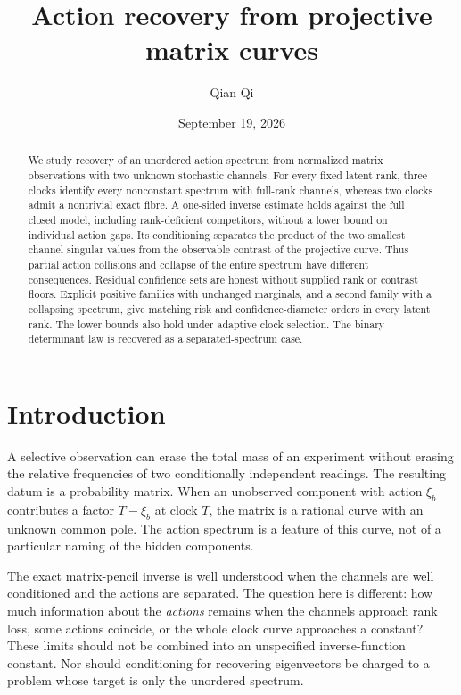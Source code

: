 \documentclass[11pt,reqno]{amsart}
\title[Action recovery from projective matrix curves]{Action recovery from projective matrix curves}
\author{Qian Qi}
\date{September 19, 2026}
\numberwithin{equation}{section}
\theoremstyle{definition}\newtheorem{definition}[theorem]{Definition}
\theoremstyle{remark}\newtheorem{remark}[theorem]{Remark}
\begin{document}
\begin{abstract}
We study recovery of an unordered action spectrum from normalized
matrix observations with two unknown stochastic channels. For every
fixed latent rank, three clocks identify every nonconstant spectrum
with full-rank channels, whereas two clocks admit a nontrivial exact fibre. A one-sided inverse estimate
holds against the full closed model, including rank-deficient
competitors, without a lower bound on individual action gaps. Its
conditioning separates the product of the two smallest channel
singular values from the observable contrast of the projective curve.
Thus partial action collisions and collapse of the entire spectrum
have different consequences. Residual confidence sets are honest
without supplied rank or contrast floors. Explicit positive families
with unchanged marginals, and a second family with a collapsing
spectrum, give matching risk and confidence-diameter orders in every
latent rank. The lower bounds also hold under adaptive clock selection.
The binary determinant law is recovered as a separated-spectrum case.
\end{abstract}
\maketitle

\section{Introduction}
A selective observation can erase the total mass of an experiment
without erasing the relative frequencies of two conditionally
independent readings. The resulting datum is a probability matrix.
When an unobserved component with action $\xi_b$ contributes a factor
$T-\xi_b$ at clock $T$, the matrix is a rational curve with an unknown
common pole. The action spectrum is a feature of this curve, not of
a particular naming of the hidden components.

The exact matrix-pencil inverse is well understood when the channels
are well conditioned and the actions are separated. The question here
is different: how much information about the \emph{actions} remains
when the channels approach rank loss, some actions coincide, or the
whole clock curve approaches a constant? These limits should not be
combined into an unspecified inverse-function constant. Nor should
conditioning for recovering eigenvectors be charged to a problem
whose target is only the unordered spectrum.
\end{document}
